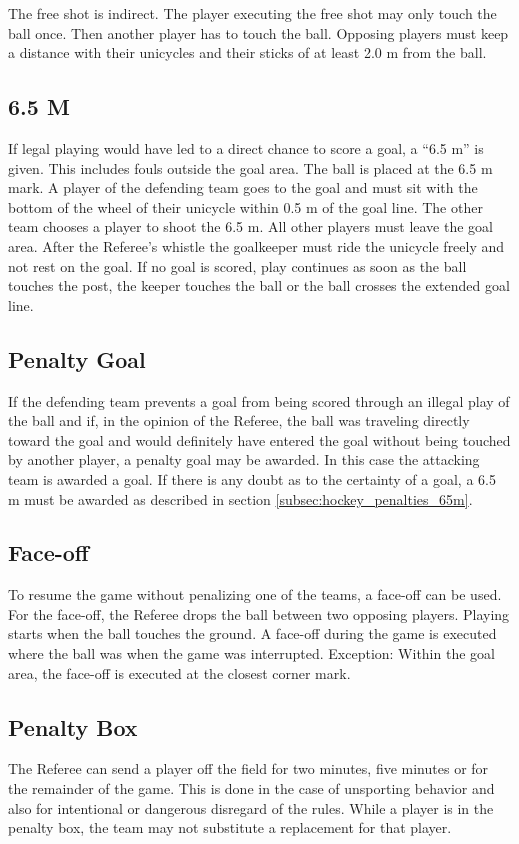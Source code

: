 The free shot is indirect.
The player executing the free shot may only touch the ball once.
Then another player has to touch the ball.
Opposing players must keep a distance with their unicycles and their sticks of at least 2.0 m from the ball.

\subsection{6.5 M \label{subsec:hockey_penalties_65m}}

If legal playing would have led to a direct chance to score a goal, a ``6.5 m'' is given.
This includes fouls outside the goal area.
The ball is placed at the 6.5 m mark.
A player of the defending team goes to the goal and must sit with the bottom of the wheel of their unicycle within 0.5 m of the goal line.
The other team chooses a player to shoot the 6.5 m.
All other players must leave the goal area.
After the Referee's whistle the goalkeeper must ride the unicycle freely and not rest on the goal.
If no goal is scored, play continues as soon as the ball touches the post, the keeper touches the ball or the ball crosses the extended goal line.

\subsection{Penalty Goal}
If the defending team prevents a goal from being scored through an illegal play of the ball and if, in the opinion of the Referee, the ball was traveling directly toward the goal and would definitely have entered the goal without being touched by another player, a penalty goal may be awarded.
In this case the attacking team is awarded a goal.
If there is any doubt as to the certainty of a goal, a 6.5 m must be awarded as described in section \ref{subsec:hockey_penalties_65m}.

\subsection{Face-off \label{subsec:hockey_penalties_face-off}}
To resume the game without penalizing one of the teams, a face-off can be used.
For the face-off, the Referee drops the ball between two opposing players.
Playing starts when the ball touches the ground.
A face-off during the game is executed where the ball was when the game was interrupted.
Exception: Within the goal area, the face-off is executed at the closest corner mark.

\subsection{Penalty Box}
The Referee can send a player off the field for two minutes, five minutes or for the remainder of the game.
This is done in the case of unsporting behavior and also for intentional or dangerous disregard of the rules.
While a player is in the penalty box, the team may not substitute a replacement for that player.

